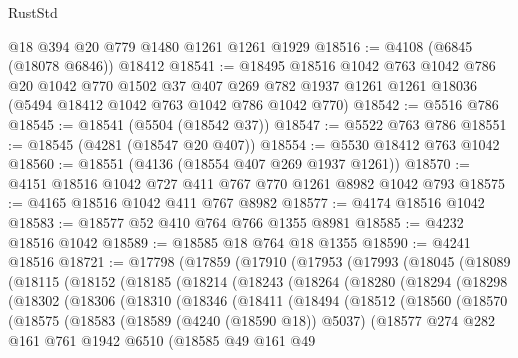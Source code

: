 \begin{lexlean}{RustStd}
\begin{coremodule}
    @18
    @394
    @20
    @779
    @1480
    @1261
    @1261
    @1929
@18516 := @4108 (@6845 (@18078 @6846)) @18412
@18541 := @18495
    @18516
    @1042
    @763
    @1042
    @786
    @20
    @1042
    @770
    @1502
    @37
    @407
    @269
    @782
    @1937
    @1261
    @1261
    @18036
    (@5494 @18412 @1042 @763 @1042 @786 @1042 @770)
@18542 := @5516 @786
@18545 := @18541 (@5504 (@18542 @37))
@18547 := @5522 @763 @786
@18551 := @18545 (@4281 (@18547 @20 @407))
@18554 := @5530 @18412 @763 @1042
@18560 := @18551 (@4136 (@18554 @407 @269 @1937 @1261))
@18570 := @4151 @18516 @1042 @727 @411 @767 @770 @1261 @8982 @1042 @793
@18575 := @4165 @18516 @1042 @411 @767 @8982
@18577 := @4174 @18516 @1042
@18583 := @18577 @52 @410 @764 @766 @1355 @8981
@18585 := @4232 @18516 @1042
@18589 := @18585 @18 @764 @18 @1355
@18590 := @4241 @18516
@18721 := @17798
    (@17859
      (@17910
        (@17953
          (@17993
            (@18045
              (@18089
                (@18115
                  (@18152
                    (@18185
                      (@18214
                        (@18243
                          (@18264
                            (@18280
                              (@18294
                                (@18298
                                  (@18302
                                    (@18306
                                      (@18310
                                        (@18346
                                          (@18411
                                            (@18494
                                              (@18512
                                                (@18560
                                                  (@18570
                                                    (@18575
                                                      (@18583
                                                        (@18589 (@4240 (@18590 @18)) @5037)
                                                        (@18577
                                                          @274
                                                          @282
                                                          @161
                                                          @761
                                                          @1942
                                                          @6510
                                                          (@18585
                                                            @49
                                                            @161
                                                            @49

\end{coremodule}
\end{lexlean}
